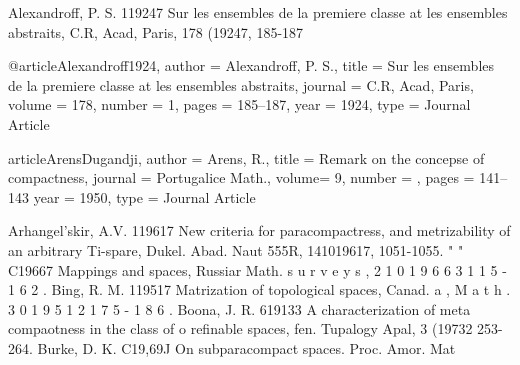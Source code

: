 
Alexandroff, P. S.
119247 Sur les ensembles de la premiere classe at
les ensembles abstraits, C.R, Acad, Paris,
178 (19247, 185-187

@article{Alexandroff1924,
	author = {Alexandroff, P. S.},
	title = {Sur les ensembles de la premiere classe at	les ensembles abstraits},
	journal = {C.R, Acad, Paris},
	volume = {178},
	number = {1},
	pages = {185--187},
	year = {1924},
	type = {Journal Article}
}

	article{ArensDugandji,
	author = {Arens, R.},
	title = {Remark on the concepse of compactness},
	journal = {Portugalice Math.},
	volume= {9},
	number = {},
	pages = {141--143}
	year = {1950},
	type = {Journal Article}
}


Arhangel'skir, A.V.
119617 New criteria for paracompactress, and
metrizability of an arbitrary Ti-spare,
Dukel. Abad. Naut 555R, 141019617, 1051-1055. " "
C19667 Mappings and spaces, Russiar Math.
s u r v e y s , 2 1 0 1 9 6 6 3 1 1 5 - 1 6 2 .
Bing, R. M.
119517 Matrization of topological spaces, Canad.
a , M a t h . 3 0 1 9 5 1 2 1 7 5 - 1 8 6 .
Boona, J. R.
619133 A characterization of meta compaotness in
the class of o refinable spaces, fen. Tupalogy
Apal, 3 (19732 253-264.
Burke, D. K.
C19,69J On subparacompact spaces. Proc. Amor. Mat
